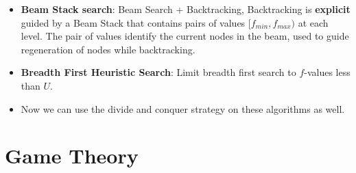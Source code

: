 \documentclass[a4paper]{article}
\begin{document}
\begin{itemize}
    \item \textbf{Beam Stack search}: Beam Search + Backtracking, Backtracking is \textbf{explicit} guided by a Beam Stack that contains pairs of values $[f_{min},f_{max})$ at each level. The pair of values identify the current nodes in the beam, used to guide regeneration of nodes while backtracking.
    \item \textbf{Breadth First Heuristic Search}: Limit breadth first search to $f$-values less than $U$.
    \item Now we can use the divide and conquer strategy on these algorithms as well.
\end{itemize}

\section{Game Theory}
\end{document}
